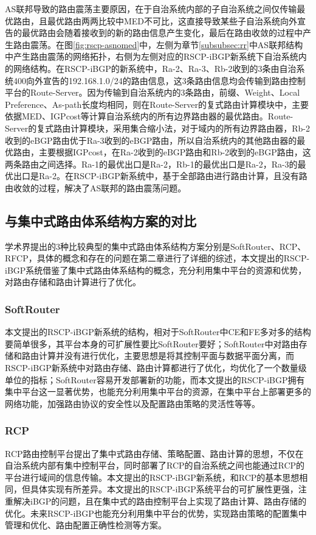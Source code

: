 AS联邦导致的路由震荡主要原因，在于自治系统内部的子自治系统之间仅传输最优路由，且最优路由两两比较中MED不可比，这直接导致某些子自治系统向外宣告的最优路由会随着接收到的新的路由信息产生变化，最后在路由收敛的过程中产生路由震荡。在图\ref{fig:rscp-asnomed}中，左侧为章节\ref{subsubsec:rr}中AS联邦结构中产生路由震荡的网络拓扑，右侧为左侧对应的RSCP-iBGP新系统下自治系统内的网络结构。在RSCP-iBGP的新系统中，Ra-2、Ra-3、Rb-2收到的3条由自治系统400向外宣告的192.168.1.0/24的路由信息，这3条路由信息均会传输到路由控制平台的Route-Server。因为传输到自治系统内的3条路由，前缀、Weight、Local Preference、As-path长度均相同，则在Route-Server的复式路由计算模块中，主要依据MED、IGPcost等计算自治系统内的所有边界路由器的最优路由。Route-Server的复式路由计算模块，采用集合缩小法，对于域内的所有边界路由器，Rb-2收到的eBGP路由优于Ra-3收到的eBGP路由，所以自治系统内的其他路由器的最优路由，主要根据IGPcost，在Ra-2收到的eBGP路由和Rb-2收到的eBGP路由，这两条路由之间选择。Ra-1的最优出口是Ra-2，Rb-1的最优出口是Ra-2，Ra-3的最优出口是Ra-2。在RSCP-iBGP新系统中，基于全部路由进行路由计算，且没有路由收敛的过程，解决了AS联邦的路由震荡问题。

\subsection{与集中式路由体系结构方案的对比}


学术界提出的3种比较典型的集中式路由体系结构方案分别是SoftRouter、RCP、RFCP，具体的概念和存在的问题在第二章进行了详细的综述，本文提出的RSCP-iBGP系统借鉴了集中式路由体系结构的概念，充分利用集中平台的资源和优势，对路由存储和路由计算进行了优化。

\subsubsection{SoftRouter}

本文提出的RSCP-iBGP新系统的结构，相对于SoftRouter中CE和FE多对多的结构要简单很多，其平台本身的可扩展性要比SoftRouter要好；SoftRouter中对路由存储和路由计算并没有进行优化，主要思想是将其控制平面与数据平面分离，而RSCP-iBGP新系统中对路由存储、路由计算都进行了优化，均优化了一个数量级单位的指标；SoftRouter容易开发部署新的功能，而本文提出的RSCP-iBGP拥有集中平台这一显著优势，也能充分利用集中平台的资源，在集中平台上部署更多的网络功能，加强路由协议的安全性以及配置路由策略的灵活性等等。

\subsubsection{RCP}
RCP路由控制平台提出了集中式路由存储、策略配置、路由计算的思想，不仅在自治系统内部有集中控制平台，同时部署了RCP的自治系统之间也能通过RCP的平台进行域间的信息传输。本文提出的RSCP-iBGP新系统，和RCP的基本思想相同，但具体实现有所差异。本文提出的RSCP-iBGP系统平台的可扩展性更强，注重解决iBGP的问题，且在集中式的路由控制平台上实现了路由计算、路由存储的优化。未来RSCP-iBGP也能充分利用集中平台的优势，实现路由策略的配置集中管理和优化、路由配置正确性检测等方案。


